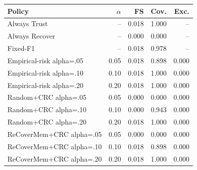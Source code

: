 \begin{tabular}{lrrrr}
\toprule
Policy & $\alpha$ & FS & Cov. & Exc. \\
\midrule
Always Trust & -- & 0.018 & 1.000 & -- \\
Always Recover & -- & 0.000 & 0.000 & -- \\
Fixed-F1 & -- & 0.018 & 0.978 & -- \\
Empirical-risk alpha=.05 & 0.05 & 0.018 & 0.898 & 0.000 \\
Empirical-risk alpha=.10 & 0.10 & 0.018 & 1.000 & 0.000 \\
Empirical-risk alpha=.20 & 0.20 & 0.018 & 1.000 & 0.000 \\
Random+CRC alpha=.05 & 0.05 & 0.000 & 0.000 & 0.000 \\
Random+CRC alpha=.10 & 0.10 & 0.000 & 0.943 & 0.000 \\
Random+CRC alpha=.20 & 0.20 & 0.018 & 1.000 & 0.000 \\
ReCoverMem+CRC alpha=.05 & 0.05 & 0.000 & 0.000 & 0.000 \\
ReCoverMem+CRC alpha=.10 & 0.10 & 0.018 & 0.898 & 0.000 \\
ReCoverMem+CRC alpha=.20 & 0.20 & 0.018 & 1.000 & 0.000 \\
\bottomrule
\end{tabular}
